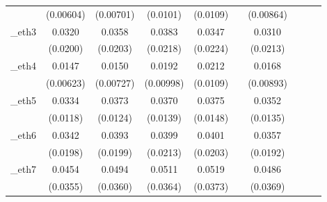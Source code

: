 \begin{table}[htbp]
\begin{tabular}{l*{9}{c}}
            &   (0.00604)         &   (0.00701)         &    (0.0101)         &    (0.0109)         &                     &   (0.00864)         &                     &                     &                     \\
[1em]
\_eth3       &      0.0320         &      0.0358\sym{*}  &      0.0383\sym{*}  &      0.0347         &                     &      0.0310         &                     &                     &                     \\
            &    (0.0200)         &    (0.0203)         &    (0.0218)         &    (0.0224)         &                     &    (0.0213)         &                     &                     &                     \\
[1em]
\_eth4       &      0.0147\sym{**} &      0.0150\sym{**} &      0.0192\sym{*}  &      0.0212\sym{*}  &                     &      0.0168\sym{*}  &                     &                     &                     \\
            &   (0.00623)         &   (0.00727)         &   (0.00998)         &    (0.0109)         &                     &   (0.00893)         &                     &                     &                     \\
[1em]
\_eth5       &      0.0334\sym{***}&      0.0373\sym{***}&      0.0370\sym{***}&      0.0375\sym{**} &                     &      0.0352\sym{***}&                     &                     &                     \\
            &    (0.0118)         &    (0.0124)         &    (0.0139)         &    (0.0148)         &                     &    (0.0135)         &                     &                     &                     \\
[1em]
\_eth6       &      0.0342\sym{*}  &      0.0393\sym{**} &      0.0399\sym{*}  &      0.0401\sym{**} &                     &      0.0357\sym{*}  &                     &                     &                     \\
            &    (0.0198)         &    (0.0199)         &    (0.0213)         &    (0.0203)         &                     &    (0.0192)         &                     &                     &                     \\
[1em]
\_eth7       &      0.0454         &      0.0494         &      0.0511         &      0.0519         &                     &      0.0486         &                     &                     &                     \\
            &    (0.0355)         &    (0.0360)         &    (0.0364)         &    (0.0373)         &                     &    (0.0369)         &                     &                     &                     \\

\end{tabular}
\end{table}
